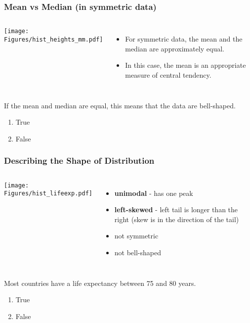 \begin{frame}
\frametitle{Mean vs Median (in symmetric data)}
\begin{columns}
\texttt{[image: Figures/hist\_heights\_mm.pdf]}
\begin{itemize}
    \item
    For symmetric data, the mean and the median are approximately equal.
    \item
    In this case, the mean is an appropriate measure of central tendency.
\end{itemize}
\end{columns}
\begin{clicker}{If the mean and median are equal, this means that the data are bell-shaped.}
\begin{enumerate}
\item True
\item False
\end{enumerate}
\end{clicker}
\end{frame}

\begin{frame}
\frametitle{Describing the Shape of Distribution}
\begin{columns}
\texttt{[image: Figures/hist\_lifeexp.pdf]}
\begin{itemize}
    \item
    \textbf{unimodal} - has one peak
    \item
    \textbf{left-skewed} - left tail is longer than the right (skew is in the direction of the tail)
    \item
    not symmetric
    \item
    not bell-shaped
\end{itemize}
\end{columns}
\begin{clicker}{Most countries have a life expectancy between 75 and 80 years.}
\begin{enumerate}
\item True
\item False
\end{enumerate}
\end{clicker}
\end{frame}

